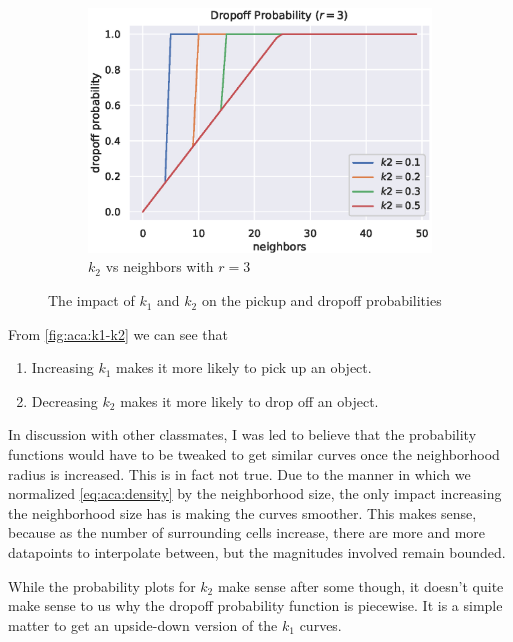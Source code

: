 \documentclass[12pt]{article}
\begin{document}
\begin{figure}[H]
\begin{subfigure}[b]{0.32\textwidth}
        \includegraphics[width=\textwidth]{figures/aca/k2-r3.eps}
        \caption{$k_2$ vs neighbors with $r=3$}
    \end{subfigure}
    \caption{The impact of $k_1$ and $k_2$ on the pickup and dropoff probabilities}\label{fig:aca:k1-k2}
\end{figure}

From \autoref{fig:aca:k1-k2} we can see that
\begin{enumerate}
    \item Increasing $k_1$ makes it more likely to pick up an object.
    \item Decreasing $k_2$ makes it more likely to drop off an object.
\end{enumerate}

In discussion with other classmates, I was led to believe that the probability functions would have to be tweaked to get similar curves once the neighborhood radius is increased.
This is in fact not true.
Due to the manner in which we normalized \autoref{eq:aca:density} by the neighborhood size, the only impact increasing the neighborhood size has is making the curves smoother.
This makes sense, because as the number of surrounding cells increase, there are more and more datapoints to interpolate between, but the magnitudes involved remain bounded.

While the probability plots for $k_2$ make sense after some though, it doesn't quite make sense to us why the dropoff probability function is piecewise.
It is a simple matter to get an upside-down version of the $k_1$ curves.
\end{document}

